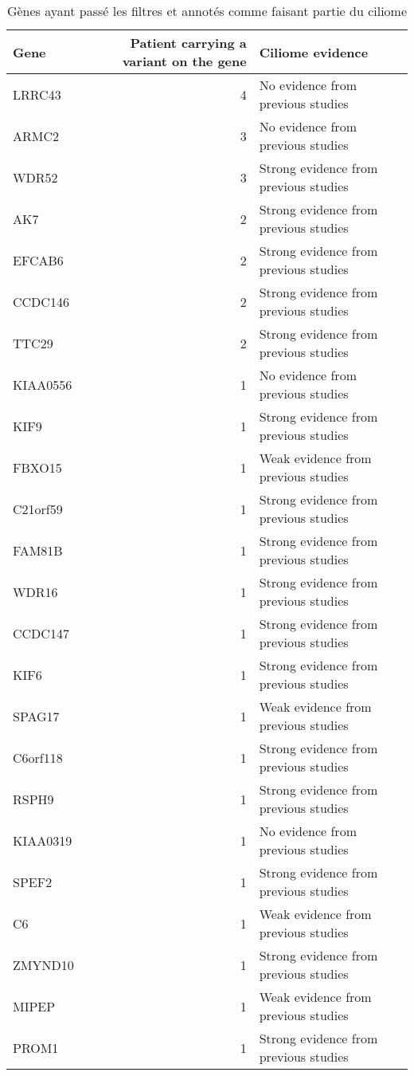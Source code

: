 \documentclass[12pt,twoside]{reedthesis}
\theoremstyle{definition}
\theoremstyle{definition}
\theoremstyle{remark}
\begin{document}
  \begin{longtable}[t]{lrl}
  \caption{\label{tab:tabciliome}Gènes ayant passé les filtres et annotés comme faisant partie du ciliome}\\
  \toprule
  Gene & Patient carrying a variant on the gene &  Ciliome evidence\\
  \midrule
  LRRC43 & 4 & No evidence from previous studies\\
  ARMC2 & 3 & No evidence from previous studies\\
  WDR52 & 3 & Strong evidence from previous studies\\
  AK7 & 2 & Strong evidence from previous studies\\
  EFCAB6 & 2 & Strong evidence from previous studies\\
  \addlinespace
  CCDC146 & 2 & Strong evidence from previous studies\\
  TTC29 & 2 & Strong evidence from previous studies\\
  KIAA0556 & 1 & No evidence from previous studies\\
  KIF9 & 1 & Strong evidence from previous studies\\
  FBXO15 & 1 & Weak evidence from previous studies\\
  \addlinespace
  C21orf59 & 1 & Strong evidence from previous studies\\
  FAM81B & 1 & Strong evidence from previous studies\\
  WDR16 & 1 & Strong evidence from previous studies\\
  CCDC147 & 1 & Strong evidence from previous studies\\
  KIF6 & 1 & Strong evidence from previous studies\\
  \addlinespace
  SPAG17 & 1 & Weak evidence from previous studies\\
  C6orf118 & 1 & Strong evidence from previous studies\\
  RSPH9 & 1 & Strong evidence from previous studies\\
  KIAA0319 & 1 & No evidence from previous studies\\
  SPEF2 & 1 & Strong evidence from previous studies\\
  \addlinespace
  C6 & 1 & Weak evidence from previous studies\\
  ZMYND10 & 1 & Strong evidence from previous studies\\
  MIPEP & 1 & Weak evidence from previous studies\\
  PROM1 & 1 & Strong evidence from previous studies\\

\end{longtable}
\end{document}
